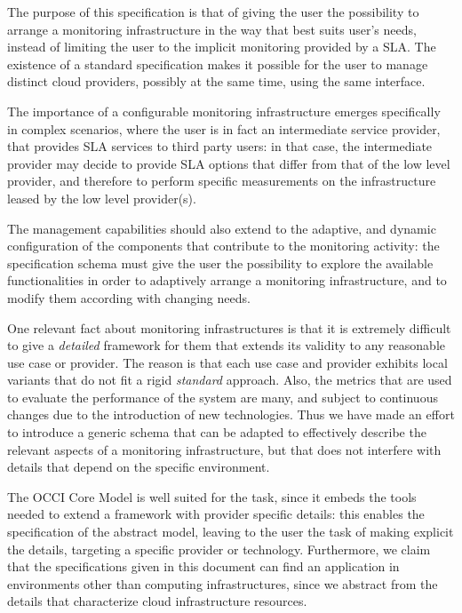 \documentclass[12pt]{article}  %
\begin{document}
The purpose of this specification is that of giving the user the possibility to arrange a monitoring infrastructure in the way that best suits user's needs, instead of limiting the user to the implicit monitoring provided by a SLA. The existence of a standard specification makes it possible for the user to manage distinct cloud providers, possibly at the same time, using the same interface.

The importance of a configurable monitoring infrastructure emerges specifically in complex scenarios, where the user is in fact an intermediate service provider, that provides SLA services to third party users: in that case, the intermediate provider may decide to provide SLA options that differ from that of the low level provider, and therefore to perform specific measurements on the infrastructure leased by the low level provider(s).

The management capabilities should also extend to the adaptive, and dynamic configuration of the components that contribute to the monitoring activity: the specification schema must give the user the possibility to explore the available functionalities in order to adaptively arrange a monitoring infrastructure, and to modify them according with changing needs.

One relevant fact about monitoring infrastructures is that it is extremely difficult to give a {\em detailed} framework for them that extends its validity to any reasonable use case or provider. The reason is that each use case and provider exhibits local variants that do not fit a rigid {\em standard} approach. Also, the metrics that are used to evaluate the performance of the system are many, and subject to continuous changes due to the introduction of new technologies. Thus we have made an effort to introduce a generic schema that can be adapted to effectively describe the relevant aspects of a monitoring infrastructure, but that does not interfere with details that depend on the specific environment.

The OCCI Core Model \cite{occi:core} is well suited for the task, since it embeds the tools needed to extend a framework with provider specific details: this enables the specification of the abstract model, leaving to the user the task of making explicit the details, targeting a specific provider or technology. Furthermore, we claim that the specifications given in this document can find an application in environments other than computing infrastructures, since we abstract from the details that characterize cloud infrastructure resources.
\end{document}
